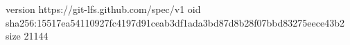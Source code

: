 version https://git-lfs.github.com/spec/v1
oid sha256:15517ea54110927fc4197d91ceab3df1ada3bd87d8b28f07bbd83275eece43b2
size 21144
